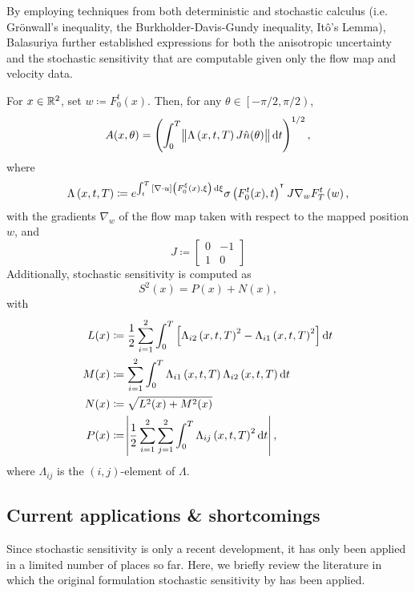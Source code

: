 By employing techniques from both deterministic and stochastic calculus (i.e. Gr\"onwall's inequality, the Burkholder-Davis-Gundy inequality, It\^o's Lemma), Balasuriya further established expressions for both the anisotropic uncertainty and the stochastic sensitivity that are computable given only the flow map and velocity data.

\begin{theorem}\label{thm:orig_s2_calculation}
	For \(x \in \mathbb{R}^2\), set \(w \coloneqq F_0^t(x)\).
	Then, for any \(\theta \in \left[-\pi/2, \pi/2\right)\),
	\[
		A(x,\theta) = \left(\int_0^T{\norm{\Lambda\left(x, t, T\right)J\hat{n}(\theta)}\dif t}\right)^{1/2},
	\]
	where
	\[
		\Lambda\left(x,t,T\right) \coloneqq e^{\int_t^T{\left[\nabla \cdot u\right]\left(F_0^\xi(x), \xi\right)\dif\xi}}\sigma\left(F_0^t(x), t\right)^{\T}J \nabla_w F_T^t\left(w\right),
	\]
	with the gradients \(\nabla_w\) of the flow map taken with respect to the mapped position \(w\), and
	\[
		J \coloneqq \begin{bmatrix}
			0 & -1 \\
			1 & 0
		\end{bmatrix}
	\]
	Additionally, stochastic sensitivity is computed as
	\[
		S^2(x) = P(x) + N(x),
	\]
	with
	\begin{align*}
		L(x) & \coloneqq \frac12\sum_{i=1}^2\int_0^T\left[\Lambda_{i2}\left(x,t, T\right)^2 - \Lambda_{i1}\left(x,t,T\right)^2\right]\dif t \\
		M(x) & \coloneqq \sum_{i=1}^2\int_0^T{\Lambda_{i1}\left(x,t,T\right)\Lambda_{i2}\left(x,t,T\right)\dif t}                           \\
		N(x) & \coloneqq \sqrt{L^2(x) + M^2(x)}                                                                                             \\
		P(x) & \coloneqq \abs{\frac12\sum_{i=1}^2\sum_{j=1}^2{\int_0^T{\Lambda_{ij}\left(x,t,T\right)^2\dif t}}},
	\end{align*}
	where \(\Lambda_{ij}\) is the \((i,j)\)-element of \(\Lambda\).
\end{theorem}








\subsection{Current applications \& shortcomings}
Since stochastic sensitivity is only a recent development, it has only been applied in a limited number of places so far.
Here, we briefly review the literature in which the original formulation stochastic sensitivity by \cite{Balasuriya_2020_StochasticSensitivityComputable} has been applied.

